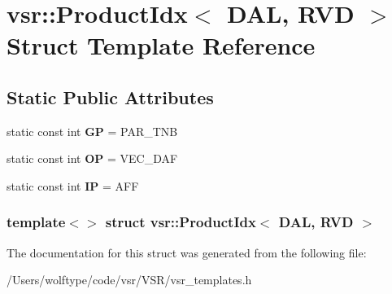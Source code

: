 \hypertarget{structvsr_1_1_product_idx_3_01_d_a_l_00_01_r_v_d_01_4}{\section{vsr\-:\-:Product\-Idx$<$ D\-A\-L, R\-V\-D $>$ Struct Template Reference}
\label{structvsr_1_1_product_idx_3_01_d_a_l_00_01_r_v_d_01_4}
}
\subsection*{Static Public Attributes}
\begin{DoxyCompactItemize}
\item 
\hypertarget{structvsr_1_1_product_idx_3_01_d_a_l_00_01_r_v_d_01_4_aeefc524dae376687efe91c728d29384b}{static const int {\bfseries G\-P} = P\-A\-R\-\_\-\-T\-N\-B}\label{structvsr_1_1_product_idx_3_01_d_a_l_00_01_r_v_d_01_4_aeefc524dae376687efe91c728d29384b}

\item 
\hypertarget{structvsr_1_1_product_idx_3_01_d_a_l_00_01_r_v_d_01_4_a46ec08c3e9aa4f73e1a469d292a74250}{static const int {\bfseries O\-P} = V\-E\-C\-\_\-\-D\-A\-F}\label{structvsr_1_1_product_idx_3_01_d_a_l_00_01_r_v_d_01_4_a46ec08c3e9aa4f73e1a469d292a74250}

\item 
\hypertarget{structvsr_1_1_product_idx_3_01_d_a_l_00_01_r_v_d_01_4_aa9fdccccf9fd4e672375508cc45d212e}{static const int {\bfseries I\-P} = A\-F\-F}\label{structvsr_1_1_product_idx_3_01_d_a_l_00_01_r_v_d_01_4_aa9fdccccf9fd4e672375508cc45d212e}

\end{DoxyCompactItemize}
\subsubsection*{template$<$$>$ struct vsr\-::\-Product\-Idx$<$ D\-A\-L, R\-V\-D $>$}



The documentation for this struct was generated from the following file\-:\begin{DoxyCompactItemize}
\item 
/\-Users/wolftype/code/vsr/\-V\-S\-R/vsr\-\_\-templates.\-h\end{DoxyCompactItemize}
